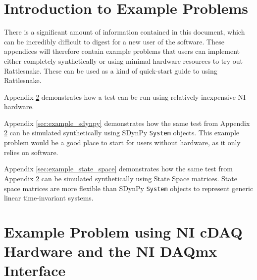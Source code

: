 \documentclass[pdf,12pt,report]{SANDreport}
\newcommand{\inlineCode}{\lstinline[basicstyle=\bfseries\ttfamily]}
\begin{document}

    \clearpage
    \providecommand*{\phantomsection}{}
    \phantomsection
    
    


    \appendix
%    
    
    \chapter{Introduction to Example Problems}
    There is a significant amount of information contained in this document, which can be incredibly difficult to digest for a new user of the software.  These appendices will therefore contain example problems that users can implement either completely synthetically or using minimal hardware resources to try out Rattlesnake.  These can be used as a kind of quick-start guide to using Rattlesnake.
    
    Appendix \ref{sec:example_nidaqmx} demonstrates how a test can be run using relatively inexpensive NI hardware.
    
    Appendix \ref{sec:example_sdynpy} demonstrates how the same test from Appendix \ref{sec:example_nidaqmx} can be simulated synthetically using SDynPy \inlineCode{System} objects.  This example problem would be a good place to start for users without hardware, as it only relies on software.
    
    Appendix \ref{sec:example_state_space} demonstrates how the same test from Appendix \ref{sec:example_nidaqmx} can be simulated synthetically using State Space matrices.  State space matrices are more flexible than SDynPy \inlineCode{System} objects to represent generic linear time-invariant systems.
    
    \chapter{Example Problem using NI cDAQ Hardware and the NI DAQmx Interface}\label{sec:example_nidaqmx}
    
\end{document}
